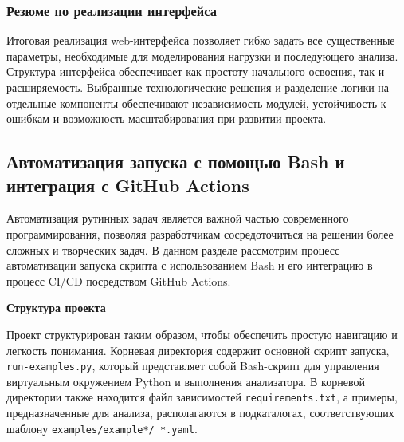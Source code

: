 \subsubsection{Резюме по реализации интерфейса}

Итоговая реализация web-интерфейса позволяет гибко задать все существенные параметры, необходимые для моделирования нагрузки и последующего анализа. Структура интерфейса обеспечивает как простоту начального освоения, так и расширяемость. Выбранные технологические решения и разделение логики на отдельные компоненты обеспечивают независимость модулей, устойчивость к ошибкам и возможность масштабирования при развитии проекта.


\subsection{Автоматизация запуска с помощью Bash и интеграция с GitHub Actions}

Автоматизация рутинных задач является важной частью современного программирования, позволяя разработчикам сосредоточиться на решении более сложных и творческих задач. В данном разделе рассмотрим процесс автоматизации запуска скрипта с использованием Bash и его интеграцию в процесс CI/CD посредством GitHub Actions.

\textbf{Структура проекта}

Проект структурирован таким образом, чтобы обеспечить простую навигацию и легкость понимания. Корневая директория содержит основной скрипт запуска, \texttt{run-examples.py}, который представляет собой Bash-скрипт для управления виртуальным окружением Python и выполнения анализатора. В корневой директории также находится файл зависимостей \texttt{requirements.txt}, а примеры, предназначенные для анализа, располагаются в подкаталогах, соответствующих шаблону \texttt{examples/example*/\ *.yaml}.

